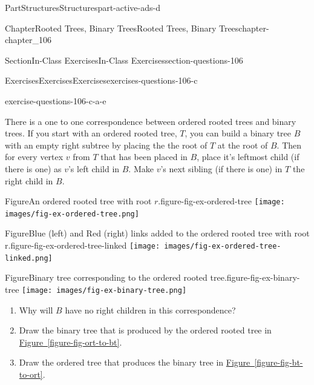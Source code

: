 \documentclass[oneside,10pt,]{book}
\newcommand{\xreffont}{\relax}
\numberwithin{equation}{section}
\begin{document}
\begin{partptx}{Part}{Structures}{}{Structures}{}{}{part-active-ads-d}
\begin{chapterptx}{Chapter}{Rooted Trees, Binary Trees}{}{Rooted Trees, Binary Trees}{}{}{chapter-chapter_106}
\begin{sectionptx}{Section}{In-Class Exercises}{}{In-Class Exercises}{}{}{section-questions-106}
\begin{exercises-subsection-numberless}{Exercises}{Exercises}{}{Exercises}{}{}{exercises-questions-106-c}
\begin{exercisegroup}
\begin{divisionexerciseeg}{5}{}{}{exercise-questions-106-c-a-e}
\begin{sidebyside}{2}{0}{0}{0}
\begin{sbspanel}{0.5}
There is a one to one correspondence between ordered rooted trees and binary trees.  If you start with an ordered rooted tree, \(T\), you can build a binary tree \(B\) with an empty right subtree by placing the the root of \(T\) at the root of \(B\).  Then for every vertex \(v\) from \(T\) that has been placed in \(B\), place it's leftmost child (if there is one) as \(v\)'s left child in \(B\). Make \(v\)'s next sibling (if there is one) in \(T\) the right child in \(B\).%
\end{sbspanel}%
\begin{sbspanel}{0.5}%
\begin{panelfigureptx}{Figure}{An ordered rooted tree with root \(r\).}{figure-fig-ex-ordered-tree}{}%
\texttt{[image: images/fig-ex-ordered-tree.png]}
\tcblower
\end{panelfigureptx}%
\end{sbspanel}%
\end{sidebyside}%
\begin{sidebyside}{2}{0}{0}{0}%
\begin{sbspanel}{0.5}%
\begin{panelfigureptx}{Figure}{Blue (left) and Red (right) links added to the ordered rooted tree with root r.}{figure-fig-ex-ordered-tree-linked}{}%
\texttt{[image: images/fig-ex-ordered-tree-linked.png]}
\tcblower
\end{panelfigureptx}%
\end{sbspanel}%
\begin{sbspanel}{0.5}%
\begin{panelfigureptx}{Figure}{Binary tree corresponding to the ordered rooted tree.}{figure-fig-ex-binary-tree}{}%
\texttt{[image: images/fig-ex-binary-tree.png]}
\tcblower
\end{panelfigureptx}%
\end{sbspanel}%
\end{sidebyside}%
\par
%
\begin{enumerate}[label=(\alph*)]
\item{}Why will \(B\) have no right children in this correspondence?%
\item{}Draw the binary tree that is produced by the ordered rooted tree in \hyperref[figure-fig-ort-to-bt]{Figure~{\xreffont\ref{figure-fig-ort-to-bt}}}.%
\item{}Draw the ordered tree that produces the binary tree in \hyperref[figure-fig-bt-to-ort]{Figure~{\xreffont\ref{figure-fig-bt-to-ort}}}.%

\end{enumerate}
\end{divisionexerciseeg}
\end{exercisegroup}
\end{exercises-subsection-numberless}
\end{sectionptx}
\end{chapterptx}
\end{partptx}
\end{document}
